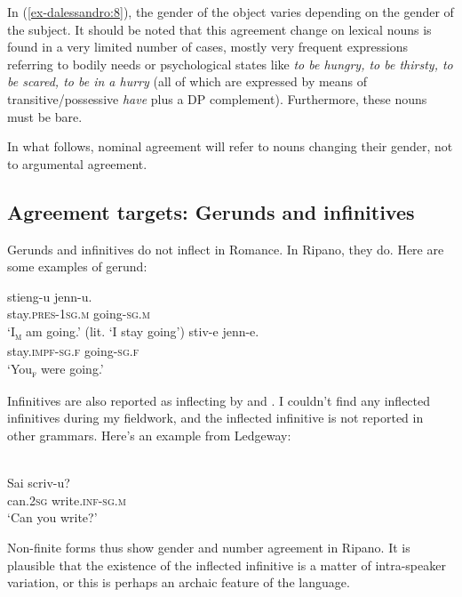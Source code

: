 \documentclass[output=paper
,modfonts
,nonflat]{langsci/langscibook}
\begin{document}
In (\ref{ex-dalessandro:8}), the gender of the object varies depending on the gender of the subject. It should be noted that this agreement change on lexical nouns is found in a very limited number of cases, mostly very frequent expressions referring to bodily needs or psychological states like \textit{to be hungry, to be thirsty, to be scared, to be in a hurry} (all of which are expressed by means of transitive/possessive \textit{have} plus a DP complement). Furthermore, these nouns must be bare.

In what follows, nominal agreement will refer to nouns changing their gender, not to argumental agreement. 

\subsection{Agreement targets: Gerunds and infinitives} \label{ex-dalessandro:1.5}
Gerunds and infinitives do not inflect in Romance. In Ripano, they do. Here are some examples of gerund:

\begin{exe}
	\ex \label{ex-dalessandro:9}	\citet[43]{Lambertelli2003} \xlist
	\ex 
	\gll stieng-u     jenn-u. \\
	stay.\textsc{pres-1sg.m} going-\textsc{sg.m}\\
	\glt `I\textsc{\textsubscript{m}} am going.' (lit. `I stay going')
	\ex
	\gll  stiv-e     jenn-e.\\
	stay.\textsc{impf-sg.f} going-\textsc{sg.f}\\
	\glt `You\textsc{\textsubscript{f}} were going.'
	\endxlist
\end{exe}
Infinitives are also reported as inflecting by \citet{Mancini1993} and \citet{Ledgeway2012}. I couldn’t find any inflected infinitives during my fieldwork, and the inflected infinitive is not reported in other grammars. Here’s an example from Ledgeway:

\begin{exe}
\ex \label{ex-dalessandro:10} \citet[302]{Ledgeway2012}\\
\gll Sai   scriv-u?\\
can.\textsc{2sg} write.\textsc{inf-sg.m}\\
\glt `Can you write?'
\end{exe}
Non-finite forms thus show gender and number agreement in Ripano. It is plausible that the existence of the inflected infinitive is a matter of intra-speaker variation, or this is perhaps an archaic feature of the language. 
\end{document}
